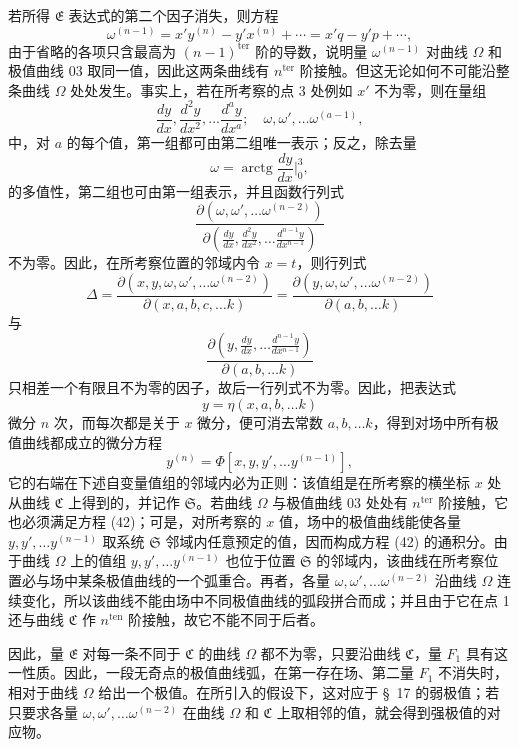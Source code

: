 \documentclass[11pt,a4paper,leqno]{article}
\begin{document}
若所得 $\mathfrak{E}$ 表达式的第二个因子消失，则方程
\[
\omega^{(n-1)}=x'y^{(n)}-y'x^{(n)}+\cdots=x'q-y'p+\cdots,
\]
由于省略的各项只含最高为 $(n-1)^{\mathrm{ter}}$ 阶的导数，说明量 $\omega^{(n-1)}$ 对曲线 $\Omega$ 和极值曲线 03 取同一值，因此这两条曲线有 $n^{\mathrm{ter}}$ 阶接触。但这无论如何不可能沿整条曲线 $\Omega$ 处处发生。事实上，若在所考察的点 3 处例如 $x'$ 不为零，则在量组
\begin{equation}\tag{41}
\frac{dy}{dx},\frac{d^2y}{dx^2},\ldots\frac{d^ay}{dx^a};
\quad \omega,\omega',\ldots\omega^{(a-1)},
\end{equation}
中，对 $a$ 的每个值，第一组都可由第二组唯一表示；反之，除去量
\[
\omega=\operatorname{arctg}\frac{dy}{dx}\bigg|_0^3,
\]
的多值性，第二组也可由第一组表示，并且函数行列式
\[
\frac{\partial(\omega,\omega',\ldots\omega^{(n-2)})}
{\partial\left(\frac{dy}{dx},\frac{d^2y}{dx^2},\ldots\frac{d^{n-1}y}{dx^{n-1}}\right)}
\]
不为零。因此，在所考察位置的邻域内令 $x=t$，则行列式
\[
\Delta=
\frac{\partial(x,y,\omega,\omega',\ldots\omega^{(n-2)})}
{\partial(x,a,b,c,\ldots k)}
=
\frac{\partial(y,\omega,\omega',\ldots\omega^{(n-2)})}
{\partial(a,b,\ldots k)}
\]
与
\[
\frac{\partial\left(y,\frac{dy}{dx},\ldots\frac{d^{n-1}y}{dx^{n-1}}\right)}
{\partial(a,b,\ldots k)}
\]
只相差一个有限且不为零的因子，故后一行列式不为零。因此，把表达式
\[
y=\eta(x,a,b,\ldots k)
\]
微分 $n$ 次，而每次都是关于 $x$ 微分，便可消去常数 $a,b,\ldots k$，得到对场中所有极值曲线都成立的微分方程
\begin{equation}\tag{42}
y^{(n)}=\Phi[x,y,y',\ldots y^{(n-1)}],
\end{equation}
它的右端在下述自变量值组的邻域内必为正则：该值组是在所考察的横坐标 $x$ 处从曲线 $\mathfrak{C}$ 上得到的，并记作 $\mathfrak{S}$。若曲线 $\Omega$ 与极值曲线 03 处处有 $n^{\mathrm{ter}}$ 阶接触，它也必须满足方程 (42)；可是，对所考察的 $x$ 值，场中的极值曲线能使各量 $y,y',\ldots y^{(n-1)}$ 取系统 $\mathfrak{S}$ 邻域内任意预定的值，因而构成方程 (42) 的通积分。由于曲线 $\Omega$ 上的值组 $y,y',\ldots y^{(n-1)}$ 也位于位置 $\mathfrak{S}$ 的邻域内，该曲线在所考察位置必与场中某条极值曲线的一个弧重合。再者，各量 $\omega,\omega',\ldots\omega^{(n-2)}$ 沿曲线 $\Omega$ 连续变化，所以该曲线不能由场中不同极值曲线的弧段拼合而成；并且由于它在点 1 还与曲线 $\mathfrak{C}$ 作 $n^{\mathrm{ten}}$ 阶接触，故它不能不同于后者。

因此，量 $\mathfrak{E}$ 对每一条不同于 $\mathfrak{C}$ 的曲线 $\Omega$ 都不为零，只要沿曲线 $\mathfrak{C}$，量
$F_1$ 具有这一性质。因此，一段无奇点的极值曲线弧，在第一存在场、第二量 $F_1$ 不消失时，相对于曲线 $\Omega$ 给出一个极值。在所引入的假设下，这对应于 \S~17 的弱极值；若只要求各量 $\omega,\omega',\ldots\omega^{(n-2)}$ 在曲线 $\Omega$ 和 $\mathfrak{C}$ 上取相邻的值，就会得到强极值的对应物。
\end{document}
